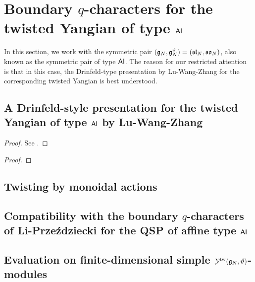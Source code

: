 \section{\texorpdfstring{Boundary $q$-characters for the twisted Yangian of type $\mathsf{A}\mathsf{I}$}{}}
    In this section, we work with the symmetric pair $(\mathfrak{g}_N, \mathfrak{g}_N^{\vartheta}) = (\mathfrak{sl}_N, \mathfrak{so}_N)$, also known as the symmetric pair of type $\mathsf{A}\mathsf{I}$. The reason for our restricted attention is that in this case, the Drinfeld-type presentation by Lu-Wang-Zhang for the corresponding twisted Yangian is best understood. 

    \subsection{A Drinfeld-style presentation for the twisted Yangian of type $\mathsf{A}\mathsf{I}$ by Lu-Wang-Zhang}
        \begin{lemma}
            
        \end{lemma}
            \begin{proof}
                See \cite[Theorem 5.1]{lu_wang_zhang_drinfeld_presentation_for_AI_twisted_yangians}.
            \end{proof}

        \begin{lemma}
            
        \end{lemma}
            \begin{proof}
                
            \end{proof}

    \subsection{Twisting by monoidal actions}

    \subsection{\texorpdfstring{Compatibility with the boundary $q$-characters of Li-Prze\'zdziecki for the QSP of affine type $\mathsf{A}\mathsf{I}$}{}}

    \subsection{\texorpdfstring{Evaluation on finite-dimensional simple $\mathcal{Y}^{\mathrm{tw}}(\mathfrak{g}_N, \vartheta)$-modules}{}}